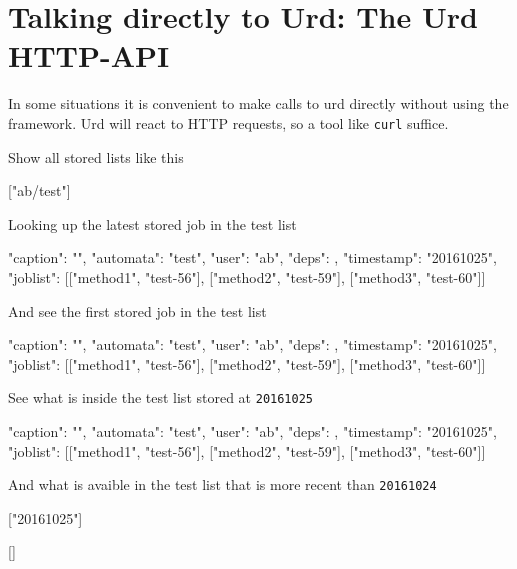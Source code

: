 \newpage
\section{Talking directly to Urd:  The Urd HTTP-API}

In some situations it is convenient to make calls to urd directly
without using the framework.  Urd will react to HTTP requests, so a
tool like \texttt{curl} suffice.

\noindent Show all stored lists like this
\begin{shell}
["ab/test"]
\end{shell}

Looking up the latest stored job in the test list
\begin{shell}
{"caption": "", "automata": "test", "user": "ab", "deps": {},
  "timestamp": "20161025", "joblist": [["method1", "test-56"],
  ["method2", "test-59"], ["method3", "test-60"]]}
\end{shell}
And see the first stored job in the test list
\begin{shell}
{"caption": "", "automata": "test", "user": "ab", "deps": {},
  "timestamp": "20161025", "joblist": [["method1", "test-56"],
  ["method2", "test-59"], ["method3", "test-60"]]}
\end{shell}
See what is inside the test list stored at \texttt{20161025}
\begin{shell}
{"caption": "", "automata": "test", "user": "ab", "deps": {},
  "timestamp": "20161025", "joblist": [["method1", "test-56"],
  ["method2", "test-59"], ["method3", "test-60"]]}
\end{shell}
And what is avaible in the test list that is more recent than \texttt{20161024}
\begin{shell}
["20161025"]
\end{shell}
\begin{shell}
[]
\end{shell}
